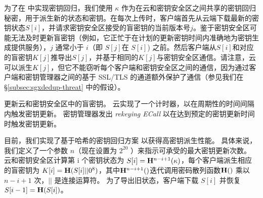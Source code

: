 为了在 \sysnameS 中实现密钥回归，我们使用 $\kappa$ 作为在云和密钥安全区之间共享的密钥回归秘密，用于派生新的状态和密钥。在每次上传时，客户端首先从云端下载最新的密钥状态$S[i]$，并请求密钥安全区接受的盲密钥的当前版本号$j$。鉴于密钥安全区可能无法及时更新盲密钥（例如，它正忙于在计划的更新密钥时间内准确地为密钥生成提供服务），$j$ 通常小于 $i$（即 $S[j]$在 $S[i]$) 之前。然后客户端从$S[i]$和对应的盲密钥$K[j]$推导出$S[j]$，并基于相同的$K[j]$与密钥安全区通信。请注意，云可以派生$K[j]$，但它不能窃听每个客户端和密钥安全区之间的通信，因为通过客户端和密钥管理器之间的基于 SSL/TLS 的通道额外保护了通信（参见我们在 \S\ref{subsec:sgxdedup-threat} 中的假设）。

\sysnameS 更新云和密钥安全区中的盲密钥。 云实现了一个计时器，以在周期性的时间间隔内触发密钥更新。 密钥管理器发出 \textit{ rekeying ECall} 以在达到预定的密钥更新时间时触发密钥更新。

目前，我们实现了基于哈希的密钥回归方案 \cite{fu06} 以获得高密钥派生性能。 具体来说，我们定义了一个参数 $n$（现在设置为 $2^{20}$ \cite{fu06}）来指示可承受的最大密钥更新次数。 云和密钥安全区计算第 i 个密钥状态为 $S[i] = {\bf H}^{n-i+1}(\kappa)$，每个客户端派生相应的盲密钥为 $K[i] = {\bf H}(S[i] || 0^8)$，其中${\bf H}^{n-i+1}()$迭代调用密码散列函数${ \bf H}()$ 乘以 $n-i+1$ 次，$||$ 是连接运算符。 为了导出旧状态，客户端下载 $S[i]$ 并恢复 $S[i-1] = {\bf H}(S[i])$。
